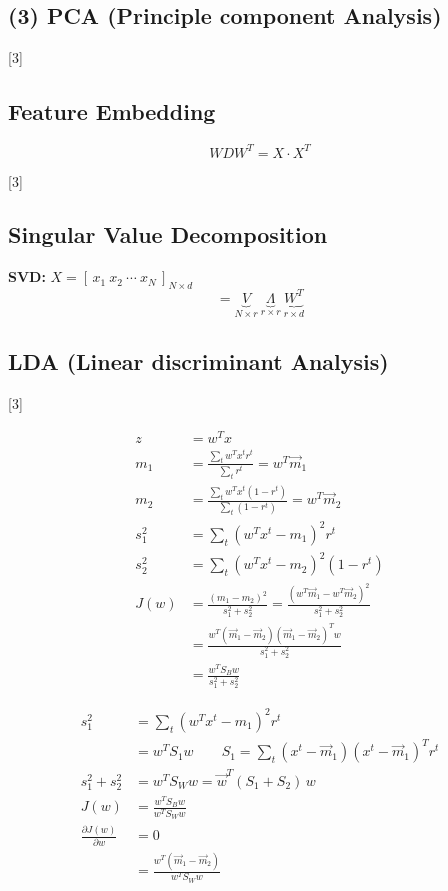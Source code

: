 \documentclass[11pt,a4paper]{article}
\begin{document}
\subsection{(3) PCA (Principle component Analysis)}

[3]

\subsection{Feature Embedding}
\[ WDW^T = X\cdot X^T \]

[3]

\subsection{Singular Value Decomposition}
\textbf{SVD:} $X=[\,x_1\ x_2\ \cdots\ x_N\,]_{N\times d}$
\[ = \underbrace{V}_{N\times r}\ \underbrace{\Lambda}_{r\times r}\ \underbrace{W^T}_{r\times d} \]

\subsection{LDA (Linear discriminant Analysis)}

[3]

\begin{align*}
z &= w^T x\\
m_1 &= \frac{\sum_t w^T x^t r^t}{\sum_t r^t} = w^T\vec{m}_1\\
m_2 &= \frac{\sum_t w^T x^t (1-r^t)}{\sum_t (1-r^t)} = w^T\vec{m}_2\\
s_1^2 &= \sum_t (w^T x^t - m_1)^2 r^t\\
s_2^2 &= \sum_t (w^T x^t - m_2)^2 (1-r^t)\\
J(w) &= \frac{(m_1-m_2)^2}{s_1^2+s_2^2} = \frac{(w^T\vec{m}_1 - w^T\vec{m}_2)^2}{s_1^2+s_2^2}\\
&= \frac{w^T(\vec{m}_1-\vec{m}_2)(\vec{m}_1-\vec{m}_2)^T w}{s_1^2+s_2^2}\\
&= \frac{w^T S_B w}{s_1^2+s_2^2}
\end{align*}

\begin{align*}
s_1^2 &= \sum_t (w^T x^t - m_1)^2 r^t\\
&= w^T S_1 w \qquad S_1=\sum_t (x^t-\vec{m}_1)(x^t-\vec{m}_1)^T r^t\\
s_1^2+s_2^2 &= w^T S_W w = \vec{w}^T(S_1+S_2)\,w\\
J(w) &= \frac{w^T S_B w}{w^T S_W w}\\
\frac{\partial J(w)}{\partial w} &= 0\\
&= \frac{w^T(\vec{m}_1-\vec{m}_2)}{w^T S_W w}
\end{align*}
\end{document}
